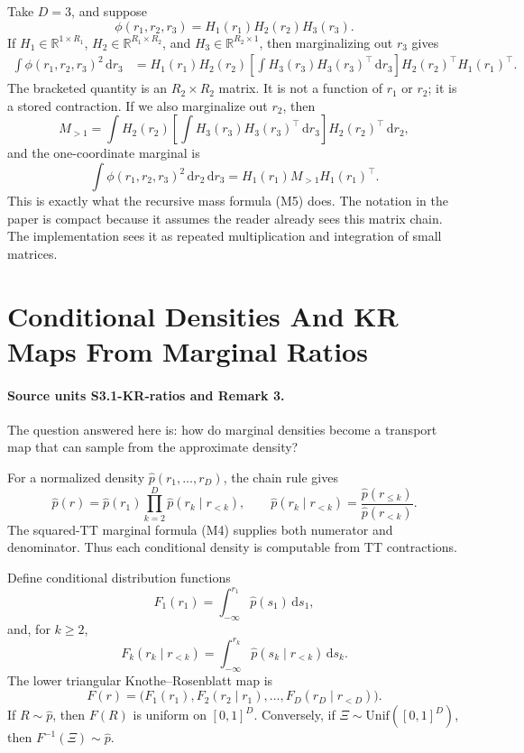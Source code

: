 \documentclass[11pt]{article}
\newcommand{\R}{\mathbb R}
\newcommand{\dd}{\,\mathrm d}
\begin{document}
Take \(D=3\), and suppose
\[
    \phi(r_1,r_2,r_3)=H_1(r_1)H_2(r_2)H_3(r_3).
\]
If \(H_1\in\R^{1\times R_1}\),
\(H_2\in\R^{R_1\times R_2}\), and
\(H_3\in\R^{R_2\times 1}\), then marginalizing out \(r_3\) gives
\[
\begin{aligned}
 \int \phi(r_1,r_2,r_3)^2\dd r_3
 &=
 H_1(r_1)H_2(r_2)
 \left[\int H_3(r_3)H_3(r_3)^\top\dd r_3\right]
 H_2(r_2)^\top H_1(r_1)^\top.
\end{aligned}
\tag{M7}
\]
The bracketed quantity is an \(R_2\times R_2\) matrix.  It is not a function of
\(r_1\) or \(r_2\); it is a stored contraction.  If we also marginalize out
\(r_2\), then
\[
    M_{>1}
    =
    \int
    H_2(r_2)
    \left[\int H_3(r_3)H_3(r_3)^\top\dd r_3\right]
    H_2(r_2)^\top
    \dd r_2,
    \tag{M8}
\]
and the one-coordinate marginal is
\[
    \int\phi(r_1,r_2,r_3)^2\dd r_2\dd r_3
    =
    H_1(r_1)M_{>1}H_1(r_1)^\top.
    \tag{M9}
\]
This is exactly what the recursive mass formula (M5) does.  The notation in the
paper is compact because it assumes the reader already sees this matrix chain.
The implementation sees it as repeated multiplication and integration of small
matrices.

\section{Conditional Densities And KR Maps From Marginal Ratios}

\paragraph{Source units S3.1-KR-ratios and Remark 3.}
The question answered here is: how do marginal densities become a transport map
that can sample from the approximate density?

For a normalized density \(\widehat p(r_1,\ldots,r_D)\), the chain rule gives
\[
    \widehat p(r)
    =
    \widehat p(r_1)
    \prod_{k=2}^D
    \widehat p(r_k\mid r_{<k}),
    \qquad
    \widehat p(r_k\mid r_{<k})
    =
    \frac{\widehat p(r_{\le k})}{\widehat p(r_{<k})}.
    \tag{K1}
\]
The squared-TT marginal formula (M4) supplies both numerator and denominator.
Thus each conditional density is computable from TT contractions.

Define conditional distribution functions
\[
    F_1(r_1)=\int_{-\infty}^{r_1}\widehat p(s_1)\dd s_1,
    \tag{K2}
\]
and, for \(k\ge2\),
\[
    F_k(r_k\mid r_{<k})
    =
    \int_{-\infty}^{r_k}
    \widehat p(s_k\mid r_{<k})\dd s_k.
    \tag{K3}
\]
The lower triangular Knothe--Rosenblatt map is
\[
    F(r)
    =
    \bigl(
    F_1(r_1),
    F_2(r_2\mid r_1),
    \ldots,
    F_D(r_D\mid r_{<D})
    \bigr).
    \tag{K4}
\]
If \(R\sim\widehat p\), then \(F(R)\) is uniform on \([0,1]^D\).  Conversely, if
\(\Xi\sim \mathrm{Unif}([0,1]^D)\), then \(F^{-1}(\Xi)\sim\widehat p\).
\end{document}
